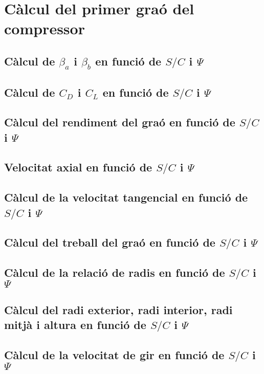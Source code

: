 \section{Càlcul del primer graó del compressor}

\subsection{Càlcul de $\beta_a$ i $\beta_b$ en funció de $S/C$ i $\Psi$}

\subsection{Càlcul de $C_D$ i $C_L$ en funció de $S/C$ i $\Psi$}

\subsection{Càlcul del rendiment del graó en funció de $S/C$ i $\Psi$}

\subsection{Velocitat axial en funció de $S/C$ i $\Psi$}

\subsection{Càlcul de la velocitat tangencial en funció de $S/C$ i $\Psi$}

\subsection{Càlcul del treball del graó en funció de $S/C$ i $\Psi$}

\subsection{Càlcul de la relació de radis en funció de $S/C$ i $\Psi$}

\subsection{Càlcul del radi exterior, radi interior, radi mitjà i altura en funció de $S/C$ i $\Psi$}

\subsection{Càlcul de la velocitat de gir en funció de $S/C$ i $\Psi$}